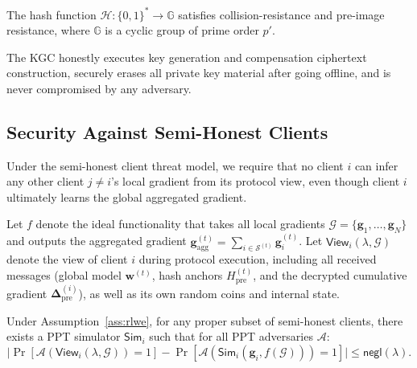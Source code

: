 \begin{assumption}
\label{ass:hash}
The hash function $\mathcal{H}: \{0,1\}^* \to \mathbb{G}$ satisfies collision-resistance and pre-image resistance, where $\mathbb{G}$ is a cyclic group of prime order $p'$.
\end{assumption}

\begin{assumption}
\label{ass:kgc}
The KGC honestly executes key generation and compensation ciphertext construction, securely erases all private key material after going offline, and is never compromised by any adversary.
\end{assumption}

\subsection{Security Against Semi-Honest Clients}
\label{ssec:semi-honest}

Under the semi-honest client threat model, we require that no client $i$ can infer any other client $j \neq i$'s local gradient from its protocol view, even though client $i$ ultimately learns the global aggregated gradient.

Let $f$ denote the ideal functionality that takes all local gradients $\mathcal{G} = \{\mathbf{g}_1, \dots, \mathbf{g}_N\}$ and outputs the aggregated gradient $\mathbf{g}_{\text{agg}}^{(t)} = \sum_{i \in \mathcal{S}^{(t)}} \mathbf{g}_i^{(t)}$. Let $\mathsf{View}_i(\lambda, \mathcal{G})$ denote the view of client $i$ during protocol execution, including all received messages (global model $\mathbf{w}^{(t)}$, hash anchors $H_{\text{pre}}^{(t)}$, and the decrypted cumulative gradient $\mathbf{\Delta}_{\text{pre}}^{(i)}$), as well as its own random coins and internal state.

\begin{theorem}
\label{thm:semi-honest}
Under Assumption~\ref{ass:rlwe}, for any proper subset of semi-honest clients, there exists a PPT simulator $\mathsf{Sim}_i$ such that for all PPT adversaries $\mathcal{A}$:
\begin{equation}
    \bigl| \Pr[\mathcal{A}(\mathsf{View}_i(\lambda, \mathcal{G})) = 1] - \Pr[\mathcal{A}(\mathsf{Sim}_i(\mathbf{g}_i, f(\mathcal{G}))) = 1] \bigr| \leq \mathsf{negl}(\lambda).
\end{equation}
\end{theorem}

